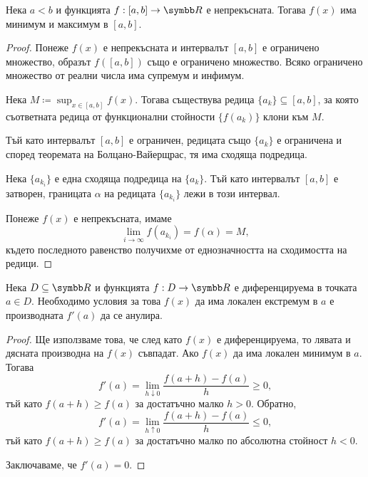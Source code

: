 \documentclass[
  headings=standardclasses,
  bibliography=totocnumbered,
]{scrartcl}
\begin{document}
\begin{theorem}[Вайерщрас]
  Нека \( a < b \) и функцията \( f: [a, b] \to \R \) е непрекъсната. Тогава \( f(x) \) има минимум и максимум в \( [a, b] \).
\end{theorem}
\begin{proof}
  Понеже \( f(x) \) е непрекъсната и интервалът \( [a, b] \) е ограничено множество, образът \( f([a, b]) \) също е ограничено множество. Всяко ограничено множество от реални числа има супремум и инфимум.

  Нека \( M \coloneqq \sup_{x \in [a, b]} f(x) \). Тогава съществува редица \( \{ a_k \} \subseteq [a, b] \), за която съответната редица от функционални стойности \( \{ f(a_k) \} \) клони към \( M \).

  Тъй като интервалът \( [a, b] \) е ограничен, редицата също \( \{ a_k \} \) е ограничена и според теоремата на Болцано-Вайерщрас, тя има сходяща подредица.

  Нека \( \{ a_{k_i} \} \) е една сходяща подредица на \( \{ a_k \} \). Тъй като интервалът \( [a, b] \) е затворен, границата \( \alpha \) на редицата \( \{ a_{k_i} \} \) лежи в този интервал.

  Понеже \( f(x) \) е непрекъсната, имаме
  \begin{equation*}
    \lim_{i \to \infty} f(a_{k_i}) = f(\alpha) = M,
  \end{equation*}
  където последното равенство получихме от еднозначността на сходимостта на редици.
\end{proof}

\begin{theorem}[Ферма]
  Нека \( D \subseteq \R \) и функцията \( f: D \to \R \) е диференцируема в точката \( a \in D \). Необходимо условия за това \( f(x) \) да има локален екстремум в \( a \) е производната \( f'(a) \) да се анулира.
\end{theorem}
\begin{proof}
  Ще използваме това, че след като \( f(x) \) е диференцируема, то лявата и дясната производна на \( f(x) \) съвпадат. Ако \( f(x) \) да има локален минимум в \( a \). Тогава
  \begin{equation*}
    f'(a) = \lim_{h \downarrow 0} \frac {f(a+h) - f(a)} h \geq 0,
  \end{equation*}
  тъй като \( f(a+h) \geq f(a) \) за достатъчно малко \( h > 0 \). Обратно,
  \begin{equation*}
    f'(a) = \lim_{h \uparrow 0} \frac {f(a+h) - f(a)} h \leq 0,
  \end{equation*}
  тъй като \( f(a+h) \geq f(a) \) за достатъчно малко по абсолютна стойност \( h < 0 \).

  Заключаваме, че \( f'(a) = 0 \).
\end{proof}
\end{document}
